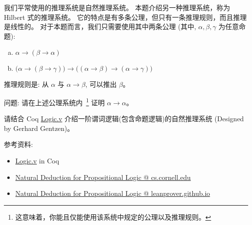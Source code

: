\documentclass[a4paper, justified]{tufte-handout}
\begin{document}
\begin{solution}
\end{solution}

\beginoptional
\begin{problem}
  我们平常使用的推理系统是自然推理系统。
  本题介绍另一种推理系统，称为 Hilbert 式的推理系统。
  它的特点是有多条公理，但只有一条推理规则，而且推理是线性的。
  对于本题而言，我们只需要使用其中两条公理 
  (其中, $\alpha, \beta, \gamma$ 为任意命题):
  \begin{enumerate}[(a)]
    \item $\alpha \to (\beta \to \alpha)$
    \item $\big(\alpha \to (\beta \to \gamma)\big) \to 
      \big((\alpha \to \beta) \to (\alpha \to \gamma) \big)$
    \end{enumerate}
  推理规则是: 从 $\alpha$ 与 $\alpha \to \beta$, 可以推出 $\beta$。

  \vspace{8pt}
  \noindent 问题: 请在上述公理系统内~\footnote{这意味着，你能且仅能使用该系统中规定的公理以及推理规则。}
  证明 $\alpha \to \alpha$。
\end{problem}

\begin{solution}
\end{solution}

\beginot
\begin{ot}[自然推理系统]
  请结合 Coq 
  \href{https://github.com/hengxin/problem-solving-class-coq/blob/master/2019-1-coq/Logic.v}{Logic.v}
  介绍一阶谓词逻辑(包含命题逻辑)的自然推理系统 (Designed by Gerhard Gentzen)。

  参考资料:
  \begin{itemize}
    \item \href{https://github.com/hengxin/problem-solving-class-coq/blob/master/2019-1-coq/Logic.v}{Logic.v} in Coq
    \item \href{https://www.cs.cornell.edu/courses/cs3110/2013sp/lectures/lec15-logic-contd/lec15.html}{Natural Deduction for Propositional Logic @ cs.cornell.edu}
    \item \href{http://leanprover.github.io/logic\_and\_proof/natural\_deduction\_for\_propositional\_logic.html}
      {Natural Deduction for Propositional Logic @ leanprover.github.io}
  \end{itemize}
\end{ot}
\end{document}
